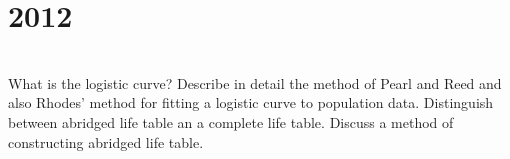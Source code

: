 \section*{2012}
\vspace{-.5cm}
\hrulefill \smallskip\\
 What is the logistic curve? Describe in detail the method of Pearl and Reed and also Rhodes' method for fitting a logistic curve to population data.
\myline
{} Distinguish between abridged life table an a complete life table. Discuss a method of constructing abridged life table.
